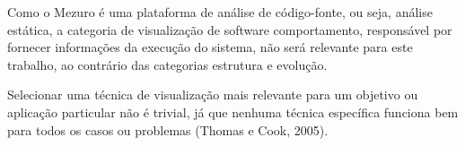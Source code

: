 Como o Mezuro é uma plataforma de análise de código-fonte, ou seja, análise estática, a categoria de visualização de software comportamento, responsável por fornecer informações da execução do sistema, não será relevante para este trabalho, ao contrário das categorias estrutura e evolução.

Selecionar uma técnica de visualização mais relevante para um objetivo ou aplicação particular não é trivial, já que nenhuma técnica específica funciona bem para todos os casos ou problemas (Thomas e Cook, 2005).

%
%
